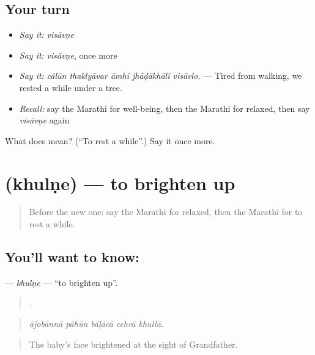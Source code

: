 \subsection*{Your turn}
\begin{itemize}
\raggedright
  \item \emph{Say it:} \emph{visāvṇe}
  \item \emph{Say it:} \emph{visāvṇe}, once more
  \item \emph{Say it:} \emph{cālūn thaklyāvar āmhī jhāḍākhālī visāvlo.} — Tired from walking, we rested a while under a tree.
  \item \emph{Recall:} say the Marathi for well-being, then the Marathi for relaxed, then say \emph{visāvṇe} again
\end{itemize}

\begin{tcolorbox}[breakable,colback=teal!4,colframe=teal!35!black,title={Before you move on}]
What does  mean? (\textquotedblleft{}To rest a while\textquotedblright{}.) Say it once more.
\end{tcolorbox}
\section[\texorpdfstring{\mr{खुलणे} (khulṇe)}{खुलणे (khulṇe)}]{ (khulṇe) — to brighten up}

\label{lesson:MR-C466-khulne}



\begin{quote}
Before the new one: say the Marathi for relaxed, then the Marathi for to rest a while.
\end{quote}

\subsection*{You'll want to know: }
\textbf{} — \emph{khulṇe} — \textquotedblleft{}to brighten up\textquotedblright{}.

\begin{quote}
    .
\end{quote}

\begin{quote}
\emph{ājobānnā pāhūn bāḷācā cehrā khullā.}
\end{quote}

\begin{quote}
The baby's face brightened at the sight of Grandfather.
\end{quote}

